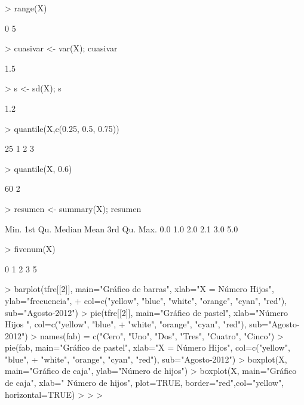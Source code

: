 \documentclass{article}
\begin{document}
\begin{Schunk}
\begin{Soutput}
\end{Soutput}
\begin{Sinput}
> range(X)
\end{Sinput}
\begin{Soutput}
[1] 0 5
\end{Soutput}
\begin{Sinput}
> cuasivar <- var(X); cuasivar
\end{Sinput}
\begin{Soutput}
[1] 1.5
\end{Soutput}
\begin{Sinput}
> s <- sd(X); s
\end{Sinput}
\begin{Soutput}
[1] 1.2
\end{Soutput}
\begin{Sinput}
> quantile(X,c(0.25, 0.5, 0.75))
\end{Sinput}
\begin{Soutput}
25%
  1   2   3 
\end{Soutput}
\begin{Sinput}
> quantile(X, 0.6)
\end{Sinput}
\begin{Soutput}
60%
  2 
\end{Soutput}
\begin{Sinput}
> resumen <- summary(X); resumen
\end{Sinput}
\begin{Soutput}
   Min. 1st Qu.  Median    Mean 3rd Qu.    Max. 
    0.0     1.0     2.0     2.1     3.0     5.0 
\end{Soutput}
\begin{Sinput}
> fivenum(X)
\end{Sinput}
\begin{Soutput}
[1] 0 1 2 3 5
\end{Soutput}
\begin{Sinput}
> barplot(tfre[[2]], main="Gráfico de barras", xlab="X = Número Hijos\n", ylab="frecuencia",
+ col=c("yellow", "blue", "white", "orange", "cyan", "red"), sub="Agosto-2012")
> pie(tfre[[2]], main="Gráfico de pastel", xlab="Número Hijos \n", col=c("yellow", "blue",
+ "white", "orange", "cyan", "red"), sub="Agosto-2012")
> names(fab) = c("Cero", "Uno", "Dos", "Tres", "Cuatro", "Cinco")
> pie(fab, main="Gráfico de pastel", xlab="X = Número Hijos\n", col=c("yellow", "blue",
+ "white", "orange", "cyan", "red"), sub="Agosto-2012")
> boxplot(X, main="Gráfico de caja", ylab="Número de hijos\n")
> boxplot(X, main="Gráfico de caja", xlab=" Número de hijos\n", plot=TRUE, border="red",col="yellow", horizontal=TRUE)
> 
> 
> 
\end{Sinput}
\end{Schunk}
\end{document}
